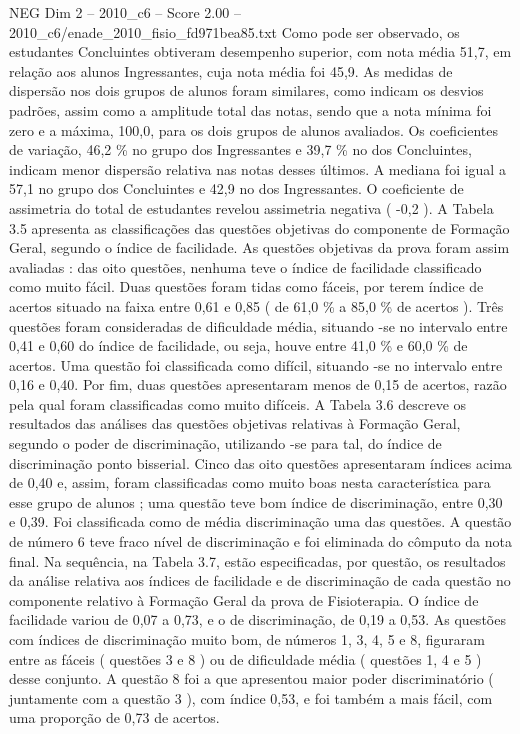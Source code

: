 \begin{textsample}{NEG Dim 2 – 2010\_c6 – Score 2.00 – 2010\_c6/enade\_2010\_fisio\_fd971bea85.txt}
Como pode ser observado, os estudantes Concluintes obtiveram desempenho superior, com nota média 51,7, em relação aos alunos Ingressantes, cuja nota média foi 45,9.
As medidas de dispersão nos dois grupos de alunos foram similares, como indicam os desvios padrões, assim como a amplitude total das notas, sendo que a nota mínima foi zero e a máxima, 100,0, para os dois grupos de alunos avaliados.
Os coeficientes de variação, 46,2 \% no grupo dos Ingressantes e 39,7 \% no dos Concluintes, indicam menor dispersão relativa nas notas desses últimos.
A mediana foi igual a 57,1 no grupo dos Concluintes e 42,9 no dos Ingressantes.
O coeficiente de assimetria do total de estudantes revelou assimetria negativa ( -0,2 ).
A Tabela 3.5 apresenta as classificações das questões objetivas do componente de Formação Geral, segundo o índice de facilidade.
As questões objetivas da prova foram assim avaliadas : das oito questões, nenhuma teve o índice de facilidade classificado como muito fácil.
Duas questões foram tidas como fáceis, por terem índice de acertos situado na faixa entre 0,61 e 0,85 ( de 61,0 \% a 85,0 \% de acertos ).
Três questões foram consideradas de dificuldade média, situando -se no intervalo entre 0,41 e 0,60 do índice de facilidade, ou seja, houve entre 41,0 \% e 60,0 \% de acertos.
Uma questão foi classificada como difícil, situando -se no intervalo entre 0,16 e 0,40.
Por fim, duas questões apresentaram menos de 0,15 de acertos, razão pela qual foram classificadas como muito difíceis.
A Tabela 3.6 descreve os resultados das análises das questões objetivas relativas à Formação Geral, segundo o poder de discriminação, utilizando -se para tal, do índice de discriminação ponto bisserial.
Cinco das oito questões apresentaram índices acima de 0,40 e, assim, foram classificadas como muito boas nesta característica para esse grupo de alunos ; uma questão teve bom índice de discriminação, entre 0,30 e 0,39.
Foi classificada como de média discriminação uma das questões.
A questão de número 6 teve fraco nível de discriminação e foi eliminada do cômputo da nota final.
Na sequência, na Tabela 3.7, estão especificadas, por questão, os resultados da análise relativa aos índices de facilidade e de discriminação de cada questão no componente relativo à Formação Geral da prova de Fisioterapia.
O índice de facilidade variou de 0,07 a 0,73, e o de discriminação, de 0,19 a 0,53.
As questões com índices de discriminação muito bom, de números 1, 3, 4, 5 e 8, figuraram entre as fáceis ( questões 3 e 8 ) ou de dificuldade média ( questões 1, 4 e 5 ) desse conjunto.
A questão 8 foi a que apresentou maior poder discriminatório ( juntamente com a questão 3 ), com índice 0,53, e foi também a mais fácil, com uma proporção de 0,73 de acertos.

\end{textsample}
